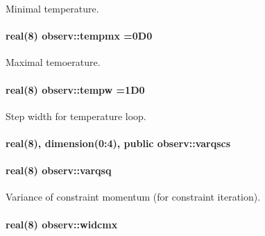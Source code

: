 Minimal temperature. 

\paragraph[{\texorpdfstring{tempmx}{tempmx}}]{\setlength{\rightskip}{0pt plus 5cm}real(8) observ\+::tempmx =0\+D0}\hypertarget{namespaceobserv_a389e94f4d08c345cc37906dc48289a9d}{}\label{namespaceobserv_a389e94f4d08c345cc37906dc48289a9d}


Maximal temoerature. 

\paragraph[{\texorpdfstring{tempw}{tempw}}]{\setlength{\rightskip}{0pt plus 5cm}real(8) observ\+::tempw =1\+D0}\hypertarget{namespaceobserv_a844b0f466d0870c37fd460723a96f21c}{}\label{namespaceobserv_a844b0f466d0870c37fd460723a96f21c}


Step width for temperature loop. 

\paragraph[{\texorpdfstring{varqscs}{varqscs}}]{\setlength{\rightskip}{0pt plus 5cm}real(8), dimension(0\+:4), public observ\+::varqscs}\hypertarget{namespaceobserv_afbab940fd904214e88cead4570ed5a45}{}\label{namespaceobserv_afbab940fd904214e88cead4570ed5a45}
\paragraph[{\texorpdfstring{varqsq}{varqsq}}]{\setlength{\rightskip}{0pt plus 5cm}real(8) observ\+::varqsq}\hypertarget{namespaceobserv_a8c28d244f2e590aebb022ae00f6cb8f6}{}\label{namespaceobserv_a8c28d244f2e590aebb022ae00f6cb8f6}


Variance of constraint momentum (for constraint iteration). 

\paragraph[{\texorpdfstring{widcmx}{widcmx}}]{\setlength{\rightskip}{0pt plus 5cm}real(8) observ\+::widcmx}\hypertarget{namespaceobserv_a01479360bb624e189a7f72acb2eb2f0d}{}\label{namespaceobserv_a01479360bb624e189a7f72acb2eb2f0d}


